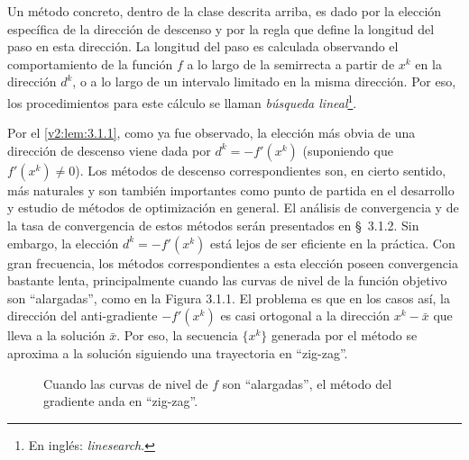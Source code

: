 Un método concreto, dentro de la clase descrita arriba, es dado por la elección específica de la dirección de descenso y por la regla que define la longitud del paso en esta dirección. La longitud del paso es calculada observando el comportamiento de la función $f$ a lo largo de la semirrecta a partir de $x^k$ en la dirección $d^k$, o a lo largo de un intervalo limitado en la misma dirección. Por eso, los procedimientos para este cálculo se llaman \textit{búsqueda lineal}\footnote{En inglés: \textit{linesearch}.}.

Por el \cref{v2:lem:3.1.1}, como ya fue observado, la elección más obvia de una dirección de descenso viene dada por $d^k = -f'(x^k)$ (suponiendo que $f'(x^k) \neq 0$). Los métodos de descenso correspondientes son, en cierto sentido, más naturales y son también importantes como punto de partida en el desarrollo y estudio de métodos de optimización en general. El análisis de convergencia y de la tasa de convergencia de estos métodos serán presentados en \S~3.1.2. Sin embargo, la elección $d^k = -f'(x^k)$ está lejos de ser eficiente en la práctica. Con gran frecuencia, los métodos correspondientes a esta elección poseen convergencia bastante lenta, principalmente cuando las curvas de nivel de la función objetivo son ``alargadas'', como en la Figura 3.1.1. El problema es que en los casos así, la dirección del anti-gradiente $-f'(x^k)$ es casi ortogonal a la dirección $x^k - \bar{x}$ que lleva a la solución $\bar{x}$. Por eso, la secuencia $\{x^k\}$ generada por el método se aproxima a la solución siguiendo una trayectoria en ``zig-zag''.

\begin{figure}[htpb]
    \centering
    \caption{Cuando las curvas de nivel de $f$ son ``alargadas'', el método del gradiente anda en ``zig-zag''.}
    \label{v2:fig:3.1.1}
\end{figure}

